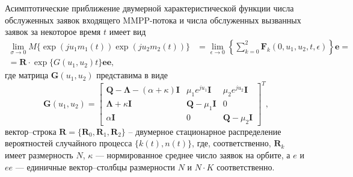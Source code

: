 \begin{theorem} \label{mmpp_theorem}
	Асимптотические приближение двумерной характеристической функции числа обслуженных заявок входящего MMPP-потока и числа обслуженных вызванных заявок за некоторое время $t$ имеет вид
	\begin{equation*} \label{theorem_twodim_map}
		\begin{split}
		  \lim_{\sigma \xrightarrow{} 0} M\{\exp(ju_{1}m_{1}(t))\exp(ju_{2}m_{2}(t))\} &=
			 \lim_{\epsilon \xrightarrow{} 0} \left\{ \sum_{k=0}^{2}\boldsymbol{F}_{k}(0,u_{1},u_{2},t,\epsilon) \right\}\boldsymbol{e} =\\ = \boldsymbol{R} \cdot \exp\{G(u_{1},u_{2})t\}\boldsymbol{ee},
		\end{split}
	\end{equation*}
	где матрица $\boldsymbol{G}(u_{1},u_{2})$ представима в виде
	\begin{equation*}
		\boldsymbol{G}(u_{1},u_{2})=\begin{bmatrix}
			\boldsymbol{Q}-\boldsymbol{\Lambda}-(\alpha + \kappa)\boldsymbol{I} & \mu_{1}e^{ju_{1}}\boldsymbol{I} &  \mu_{2}e^{ju_{2}}\boldsymbol{I}\\
			\boldsymbol{\Lambda}+\kappa\boldsymbol{I} & \boldsymbol{Q}-\mu_{1}\boldsymbol{I} & 0\\
			\alpha\boldsymbol{I} & 	0 &	\boldsymbol{Q}-\mu_{2}\boldsymbol{I}
		\end{bmatrix}^{T},
	\end{equation*}
	вектор--строка $\boldsymbol{R}=\{\boldsymbol{R}_{0},\boldsymbol{R}_{1},\boldsymbol{R}_{2}\}$ -- двумерное стационарное распределение вероятностей случайного процесса $\{k(t),n(t)\}$, где, соответственно,  $\boldsymbol{R}_{k}$ имеет размерность $N$, $\kappa$ --- нормированное среднее число заявок на орбите, а $e$ и $ee$ --- единичные вектор--столбцы размерности $N$ и $N \cdot K$ соответственно.
\end{theorem}
